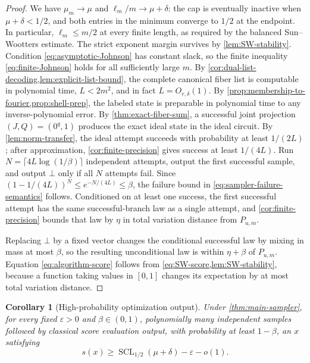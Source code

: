 \documentclass[11pt,letterpaper]{article}
\newtheorem{corollary}[theorem]{Corollary}
\theoremstyle{definition}
\newcommand{\SCL}{\operatorname{SCL}}
\begin{document}
\begin{proof}
We have $\mu_m\to\mu$ and $\ell_m/m\to\mu+\delta$: the cap is eventually inactive when $\mu+\delta<1/2$, and both entries in the minimum converge to $1/2$ at the endpoint.  In particular, $\ell_m\le m/2$ at every finite length, as required by the balanced Sun--Wootters estimate.  The strict exponent margin survives by \cref{lem:SW-stability}.  Condition \eqref{eq:asymptotic-Johnson} has constant slack, so the finite inequality \cref{eq:finite-Johnson} holds for all sufficiently large $m$.  By \cref{cor:dual-list-decoding,lem:explicit-list-bound}, the complete canonical fiber list is computable in polynomial time, $L<2m^2$, and in fact $L=O_{r,\delta}(1)$.  By \cref{prop:membership-to-fourier,prop:shell-prep}, the labeled state is preparable in polynomial time to any inverse-polynomial error.  By \cref{thm:exact-fiber-sum}, a successful joint projection $(J,Q)=(0^q,1)$ produces the exact ideal state in the ideal circuit.  By \cref{lem:norm-transfer}, the ideal attempt succeeds with probability at least $1/(2L)$; after approximation, \cref{cor:finite-precision} gives success at least $1/(4L)$.  Run
$N=\lceil4L\log(1/\beta)\rceil$ independent attempts, output the first successful sample, and output $\bot$ only if all $N$ attempts fail.  Since $(1-1/(4L))^N\le e^{-N/(4L)}\le\beta$, the failure bound in \cref{eq:sampler-failure-semantics} follows.  Conditioned on at least one success, the first successful attempt has the same successful-branch law as a single attempt, and \cref{cor:finite-precision} bounds that law by $\eta$ in total variation distance from $P_{u,m}$.

Replacing $\bot$ by a fixed vector changes the conditional successful law by mixing in mass at most $\beta$, so the resulting unconditional law is within $\eta+\beta$ of $P_{u,m}$.  Equation \eqref{eq:algorithm-score} follows from \cref{eq:SW-score,lem:SW-stability}, because a function taking values in $[0,1]$ changes its expectation by at most total variation distance.
\end{proof}

\begin{corollary}[High-probability optimization output]
\label{cor:high-probability-score}
Under \cref{thm:main-sampler}, for every fixed $\varepsilon>0$ and $\beta\in(0,1)$, polynomially many independent samples followed by classical score evaluation output, with probability at least $1-\beta$, an $x$ satisfying
\begin{equation}
   s(x)\ge\SCL_{1/2}(\mu+\delta)-\varepsilon-o(1).
\end{equation}
\end{corollary}
\end{document}

